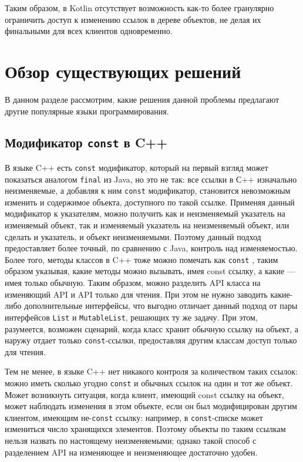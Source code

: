 \documentclass[specification,annotation,times]{itmo-student-thesis}
\begin{document}
Таким образом, в Kotlin отсутствует возможность как-то более гранулярно ограничить доступ к изменению ссылок в дереве объектов, не 
делая их финальными для всех клиентов одновременно.

\section{Обзор существующих решений}
\startrelatedwork

В данном разделе рассмотрим, какие решения данной проблемы предлагают другие популярные языки программирования.

\subsection{Модификатор \texttt{const} в C++}

В языке C++ есть \texttt{const} модификатор, который на первый взгляд может показаться аналогом \texttt{final} из Java, но это не так: все ссылки в С++ изначально неизменяемые, а добавляя к ним \texttt{const} модификатор, становится невозможным изменить и содержимое объекта, доступного по такой ссылке.
Применяя данный модификатор к указателям, можно получить как и неизменяемый указатель на изменяемый объект, так и изменяемый указатель на неизменяемый объект, или сделать и указатель, и объект неизменяемыми.
Поэтому данный подход предоставляет более точный, по сравнению с Java, контроль над изменяемостью.
Более того, методы классов в C++ тоже можно помечать как \texttt{const} \cite{cpp-const}, таким образом указывая, какие методы можно вызывать, имея const ссылку, а какие --- имея только обычную.
Таким образом, можно разделить API класса на изменяющий API и API только для чтения. При этом не нужно заводить какие-либо дополнительные интерфейсы, что выгодно отличает данный подход от пары интерфейсов \texttt{List} и \texttt{MutableList}, решающих ту же задачу.
При этом, разумеется, возможен сценарий, когда класс хранит обычную ссылку на объект, а наружу отдает только \texttt{const}-ссылки, предоставляя другим классам доступ только для чтения.

Тем не менее, в языке C++ нет никакого контроля за количеством таких ссылок: можно иметь сколько угодно \texttt{const} и обычных ссылок на один и тот же объект. Может возникнуть ситуация, когда клиент, имеющий const ссылку на объект, может наблюдать изменения в этом объекте, если он был модифицирован другим клиентом, имеющим не-\texttt{const} ссылку: например, в \texttt{const}-списке может измениться число хранящихся элементов.
Поэтому объекты по таким ссылкам нельзя назвать по настоящему неизменяемыми; однако такой способ с разделением API на изменяющее и неизменяющее достаточно удобен.
\end{document}
